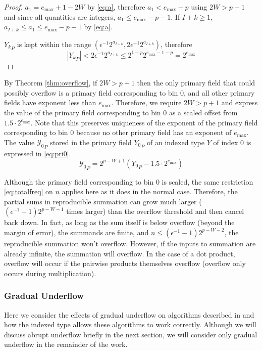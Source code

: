       \begin{proof}
        $a_1 = e_{\max} + 1 - 2 W$ by \eqref{eq:a}, therefore $a_1 < e_{\max} - p$ using $2W > p+1$ and since all quantities are integers, $a_1 \leq e_{\max} - p - 1$. If $I + k \geq 1$, $a_{I + k} \leq a_1 \leq e_{\max} - p - 1$ by \eqref{eq:a}.

        ${Y_k}_P$ is kept within the range $(\epsilon^{-1} 2^{a_{I + k}}, 2 \epsilon^{-1} 2^{a_{I + k}})$, therefore
        \begin{equation*}
          |{Y_k}_P| < 2 \epsilon^{-1} 2^{a_{I + k}} \leq 2^{1 + p} 2^{e_{\max} - 1 - p} = 2^{e_{\max}}
        \end{equation*}
      \end{proof}
      By Theorem \ref{thm:overflow}, if $2 W > p + 1$ then the only primary
      field that could possibly overflow is a primary field corresponding to
      bin 0, and all other primary fields have exponent less than $e_{\max}$.
      Therefore, we require $2 W > p + 1$ and express the value of the primary
      field corresponding to bin 0 as a scaled offset from
      $1.5\cdot2^{e_{\max}}$. Note that this preserves uniqueness of the
      exponent of the primary field corresponding to bin 0 because no other
      primary field has an exponent of $e_{\max}$. The value
      ${\mathcal{Y}_0}_P$ stored in the primary field ${Y_0}_P$ of an indexed
      type $Y$ of index 0 is expressed in \eqref{eq:pri0}.
      \begin{equation}
        {\mathcal{Y}_0}_P = 2^{p - W + 1}({Y_0}_P - 1.5\cdot2^{e_{\max}})
        \label{eq:pri0}
      \end{equation}

      Although the primary field corresponding to bin 0 is scaled, the same restriction \eqref{eq:totalfreq} on $n$ applies here as it does in the normal case. Therefore, the partial sums in reproducible summation can grow much larger ($(\epsilon^{-1} - 1)2^{p - W - 1}$ times larger) than the overflow threshold and then cancel back down. In fact, as long as the sum itself is below overflow (beyond the margin of error), the summands are finite, and $n \leq (\epsilon^{-1} - 1)2^{p - W - 2}$, the reproducible summation won't overflow. However, if the inputs to summation are already infinite, the summation will overflow. In the case of a dot product, overflow will occur if the pairwise products themselves overflow (overflow only occurs during multiplication).

    \subsubsection{Gradual Underflow}
      \label{sec:indexed_underflow_gradual}
      Here we consider the effects of gradual underflow on algorithms described
      in \cite{repsum} and how the indexed type allows these algorithms to work
      correctly. Although we will discuss abrupt underflow briefly in the next section, we will consider only gradual underflow in the remainder of the work.


